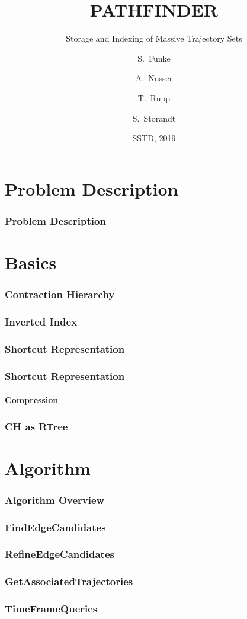 \documentclass{beamer}
\title[Pathfinder] %
{PATHFINDER}
\subtitle{Storage and Indexing of Massive Trajectory Sets}
\author[Funke, Nusser, Rupp, Storandt] %
{S.~Funke\inst{1} \and A.~Nusser\inst{2} \and T.~Rupp\inst{3} \and S.~Storandt\inst{4}}
\institute[Universities] %
{
	\inst{1}%
	University of Stuttgart
	\and
	\inst{2}%
	Max Planck Institute for Informatics
	\and
	\inst{3}%
	University of Stuttgart
	\and
	\inst{4}%
	University of Konstanz
}
\date[SSTD 2019] %
{SSTD, 2019}
\begin{document}
\frame{\titlepage}

\frame{\tableofcontents}

\section{Problem Description}
\begin{frame}
	\frametitle{Problem Description}
\end{frame}

\section{Basics}
\begin{frame}
	\frametitle{Contraction Hierarchy}
\end{frame}

\begin{frame}
	\frametitle{Inverted Index}
\end{frame}

\begin{frame}
	\frametitle{Shortcut Representation}
\end{frame}

\begin{frame}
	\frametitle{Shortcut Representation}
	\framesubtitle{Compression}
\end{frame}

\begin{frame}
	\frametitle{CH as RTree}
\end{frame}

\section{Algorithm}

\begin{frame}
	\frametitle{Algorithm Overview}
\end{frame}

\begin{frame}
	\frametitle{FindEdgeCandidates}
\end{frame}

\begin{frame}
	\frametitle{RefineEdgeCandidates}
\end{frame}

\begin{frame}
	\frametitle{GetAssociatedTrajectories}
\end{frame}

\begin{frame}
	\frametitle{TimeFrameQueries}
\end{frame}
\end{document}
